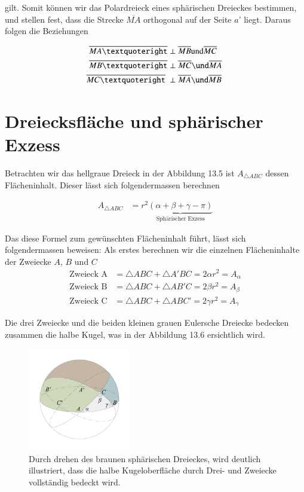 \begin{refsection}
gilt. 
Somit können wir das Polardreieck eines sphärischen Dreieckes bestimmen, und stellen fest, dass die Strecke $\overline{MA}$ orthogonal auf der Seite $a’$ liegt. Daraus folgen die Beziehungen

\begin{align*}
\overline{MA’} &\perp \overline{MB} \text{und} \overline{MC} \\
\overline{MB’} &\perp \overline{MC} \und \overline{MA} \\
\overline{MC’} &\perp \overline{MA} \und \overline{MB}
\end{align*}

\section{Dreiecksfläche und sphärischer Exzess} \label{Flaeche}
Betrachten wir das hellgraue Dreieck in der Abbildung 13.5 ist $A_{ \triangle{ ABC }}$ dessen Flächeninhalt. Dieser lässt sich folgendermassen berechnen

\begin{align*}
A_{ \triangle{ ABC }}  &= r^{ 2 }\underbrace{(\alpha + \beta + \gamma - \pi)}_{\text{Sphärischer Exzess}}
\end{align*}

Das diese Formel zum gewünschten Flächeninhalt führt, lässt sich folgendermassen beweisen:
Als erstes berechnen wir die einzelnen Flächeninhalte der Zweiecke $A$, $B$ und $C$
\begin{align*}
\text{Zweieck A}
&=
\triangle{ABC} + \triangle{A'BC} = 2 \alpha r^{ 2 } = A_{ \alpha }\\
\text{Zweieck B}
&=
\triangle{ABC} + \triangle{AB'C} = 2 \beta r^{ 2 } = A_{ \beta }\\
\text{Zweieck C}
&=
\triangle{ABC} + \triangle{ABC’} = 2 \gamma r^{ 2 } = A_{ \gamma }
\end{align*}

Die drei Zweiecke und die beiden kleinen grauen Eulersche Dreiecke bedecken zusammen die halbe Kugel, was in der Abbildung 13.6 ersichtlich wird.

\begin{figure}[htbp]
\centering
\includegraphics[width=0.4\textwidth]{kugel/HalbeKugel.jpg}
\caption{Durch drehen des braunen sphärischen Dreieckes, wird deutlich illustriert, dass die halbe Kugeloberfläche durch Drei- und Zweiecke vollständig bedeckt wird.}
\end{figure}


\end{refsection}
